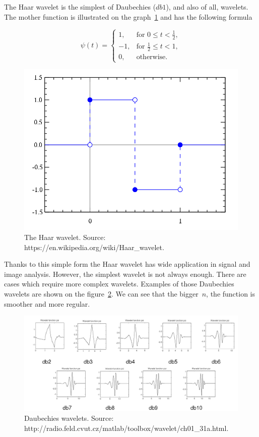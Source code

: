 The Haar wavelet is the simplest of Daubechies ($db1$), and also of all, wavelets. The mother function is illustrated on the graph~\ref{fig:haar} and has the following formula

\begin{equation}
\psi(t)=
\begin{cases}
1, & \text{for } 0 \leq t < \frac{1}{2}, \\
-1, & \text{for } \frac{1}{2} \leq t < 1, \\
0, & \text{otherwise}.
\end{cases}
\end{equation}

\begin{figure}[h]
	\centering
	\includegraphics[width=.5\textwidth]{Haar_wavelet.png}
	\caption{The Haar wavelet. \newline
		Source: https://en.wikipedia.org/wiki/Haar\_wavelet.}
	\label{fig:haar}
\end{figure}

Thanks to this simple form the Haar wavelet has wide application in signal and image analysis.
However, the simplest wavelet is not always enough. There are cases which require more complex wavelets. Examples of those Daubechies wavelets are shown on the figure~\ref{fig:db_wavelets}. We can see that the bigger~$n$, the function is smoother and more regular.

\begin{figure}[h]
	\centering
	\includegraphics[width=\textwidth]{DB_N.png}
	\caption{Daubechies wavelets. \newline
		Source: http://radio.feld.cvut.cz/matlab/toolbox/wavelet/ch01\_31a.html.}
	\label{fig:db_wavelets}
\end{figure}

